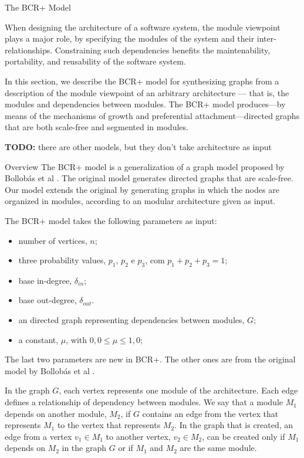 \documentclass[11pt,twocolumn,a4paper,english]{article}
\newcommand{\TODO}{\textbf{TODO:} }
\begin{document}
\begin{section}{The BCR+ Model}	
	\newcommand{\din}[0]{\ensuremath{\delta_{in}}}
	\newcommand{\dout}[0]{\ensuremath{\delta_{out}}}
	\newcommand{\gin}[0]{\ensuremath{\mathrm{d}_{in}}}
	\newcommand{\gout}[0]{\ensuremath{\mathrm{d}_{out}}}
	
	When designing the architecture of a software system, the module viewpoint plays a major role, by specifying the modules of the system and their inter-relationships. Constraining such dependencies benefits the maintenability, portability, and reusability of the software system.
	
	In this section, we describe the BCR+ model for synthesizing graphs from a description of the module viewpoint of an arbitrary architecture --- that is, the modules and dependencies between modules. The BCR+ model produces---by means of the mechanisms of growth and preferential attachment---directed graphs that are both scale-free and segmented in modules.
	
	\TODO there are other models, but they don't take architecture as input	
	
\begin{subsection}{Overview}
	The BCR+ model is a generalization of a graph model proposed by Bollobás et al \cite{Bollobas2003}. The original model generates directed graphs that are scale-free. Our model extends the original by generating graphs in which the nodes are organized in modules, according to an modular architecture given as input.
	
	The BCR+ model takes the following parameters as input:
	
	\begin{itemize}
  \item number of vertices, $n$;
  \item three probability values, $p_1$, $p_2$ e $p_3$, com $p_1 + p_2 + p_3 = 1$;
  \item base in-degree, $\din$;
  \item base out-degree, $\dout$.
  \item an directed graph representing dependencies between modules, $G$;
  \item a constant, $\mu$, with $0,0 \le \mu \le 1,0$;
  \end{itemize}
  
	The last two parameters are new in BCR+. The other ones are from the original model by Bollobás et al \cite{Bollobas2003}.
	
	In the graph $G$, each vertex represents one module of the architecture. Each edge defines a relationship of dependency between modules. We say that a module $M_1$ depends on another module, $M_2$, if $G$ contains an edge from the vertex that represents $M_1$ to the vertex that represents $M_2$. In the graph that is created, an edge from a vertex $v_1 \in M_1$ to another vertex, $v_2 \in M_2$, can be created only if $M_1$ depends on $M_2$ in the graph $G$ or if $M_1$ and $M_2$ are the same module.
	

\end{subsection}
\end{section}
\end{document}
